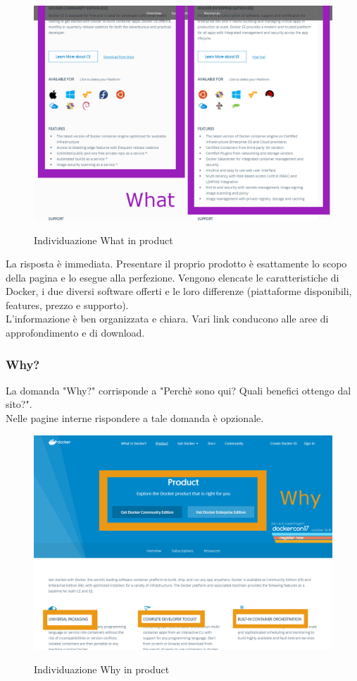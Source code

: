 \documentclass[a4paper]{article}
\begin{document}
\begin{figure}[H]
	\centering
	\includegraphics[width=\linewidth]{images/productwhat2.png}
    \label{fig:productwhat2}
    \caption{Individuazione What in product}
\end{figure}

\noindent La risposta è immediata. Presentare il proprio prodotto è esattamente lo scopo della pagina e lo esegue alla perfezione. Vengono elencate le caratteristiche di Docker, i due diversi software offerti e le loro differenze (piattaforme disponibili, features, prezzo e supporto).
\\
L'informazione è ben organizzata e chiara. Vari link conducono alle aree di approfondimento e di download.

\newpage
\subsubsection{Why?}
La domanda "Why?" corrisponde a "Perchè sono qui? Quali benefici ottengo dal sito?".
\\
Nelle pagine interne rispondere a tale domanda è opzionale.

\begin{figure}[H]
	\centering
	\includegraphics[width=\linewidth]{images/productwhy1.png}
    \label{fig:productwhy1}
    \caption{Individuazione Why in product}
\end{figure}
\end{document}
